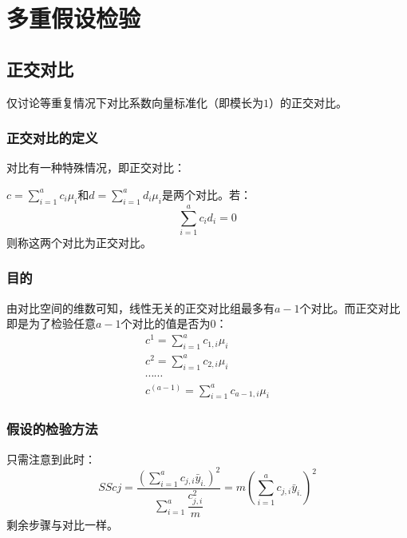 \section{多重假设检验}

\subsection{正交对比}
仅讨论等重复情况下对比系数向量标准化（即模长为$1$）的正交对比。
\subsubsection{正交对比的定义}
对比有一种特殊情况，即正交对比：
\begin{definition}
	$c=\sum\limits_{i=1}^ac_i\mu_i$和$d=\sum\limits_{i=1}^ad_i\mu_i$是两个对比。若：
	\begin{equation*}
		\sum_{i=1}^ac_id_i=0
	\end{equation*}
	则称这两个对比为正交对比。
\end{definition}
\subsubsection{目的}
由对比空间的维数可知，线性无关的正交对比组最多有$a-1$个对比。而正交对比即是为了检验任意$a-1$个对比的值是否为$0$：
\begin{gather*}
	c^1=\sum_{i=1}^ac_{1,i}\mu_i \\
	c^2=\sum_{i=1}^ac_{2,i}\mu_i \\
	\cdots\cdots \\
	c^{(a-1)}=\sum_{i=1}^ac_{a-1,i}\mu_i
\end{gather*}
\subsubsection{假设的检验方法}
只需注意到此时：
\begin{equation*}
	SScj=\frac{\left(\sum\limits_{i=1}^ac_{j,i}\bar{y}_{i.}\right)^2}{\sum\limits_{i=1}^a\dfrac{c_{j,i}^2}{m}}=m\left(\sum\limits_{i=1}^ac_{j,i}\bar{y}_{i.}\right)^2
\end{equation*}
剩余步骤与对比一样。
